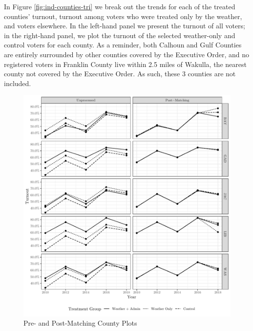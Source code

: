 \documentclass[
  12pt,
]{article}
\begin{document}
In Figure \ref{fig:ind-counties-tri} we break out the trends for each of the treated counties' turnout, turnout among voters who were treated only by the weather, and voters elsewhere. In the left-hand panel we present the turnout of all voters; in the right-hand panel, we plot the turnout of the selected weather-only and control voters for each county. As a reminder, both Calhoun and Gulf Counties are entirely surrounded by other counties covered by the Executive Order, and no registered voters in Franklin County live within 2.5 miles of Wakulla, the nearest county not covered by the Executive Order. As such, these 3 counties are not included.

\begin{figure}[H]

{\centering \includegraphics{si_files/figure-latex/indcs-chunk-tr-1} 

}

\caption{\label{fig:ind-counties-tri}Pre- and Post-Matching County Plots}\label{fig:indcs-chunk-tr}
\end{figure}
\end{document}
